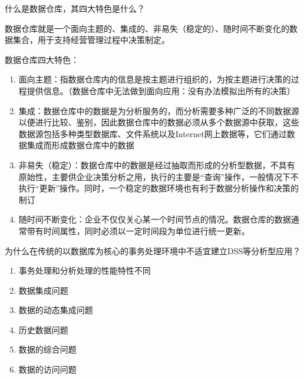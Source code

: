 \begin{problem}
什么是数据仓库，其四大特色是什么？
\end{problem}

\begin{solution}
数据仓库就是一个面向主题的、集成的、非易失（稳定的）、随时间不断变化的数据集合，用于支持经营管理过程中决策制定。

数据仓库四大特色：
\begin{enumerate}[label=\arabic*.]
    \item 面向主题：指数据仓库内的信息是按主题进行组织的，为按主题进行决策的过程提供信息。（数据仓库中无法做到面向应用：没有办法模拟出所有的决策）
    \item 集成：数据仓库中的数据是为分析服务的，而分析需要多种广泛的不同数据源以便进行比较、鉴别，因此数据仓库中的数据必须从多个数据源中获取，这些数据源包括多种类型数据库、文件系统以及Internet网上数据等，它们通过数据集成而形成数据仓库中的数据
    \item 非易失（稳定）：数据仓库中的数据是经过抽取而形成的分析型数据，不具有原始性，主要供企业决策分析之用，执行的主要是“查询”操作，一般情况下不执行“更新”操作。同时，一个稳定的数据环境也有利于数据分析操作和决策的制订
    \item 随时间不断变化：企业不仅仅关心某一个时间节点的情况。数据仓库的数据通常带有时间属性，同时必须以一定时间段为单位进行统一更新。
\end{enumerate}
\end{solution}


\begin{problem}
为什么在传统的以数据库为核心的事务处理环境中不适宜建立DSS等分析型应用？
\end{problem}

\begin{solution}
\vspace{-0.7em}
\begin{multicols}{2}
    \begin{enumerate}[label=\arabic*.]
        \item 事务处理和分析处理的性能特性不同
        \item 数据集成问题
        \item 数据的动态集成问题
        \item 历史数据问题
        \item 数据的综合问题
        \item 数据的访问问题
    \end{enumerate}
\end{multicols}
\vspace{-0.7em}
\end{solution}


